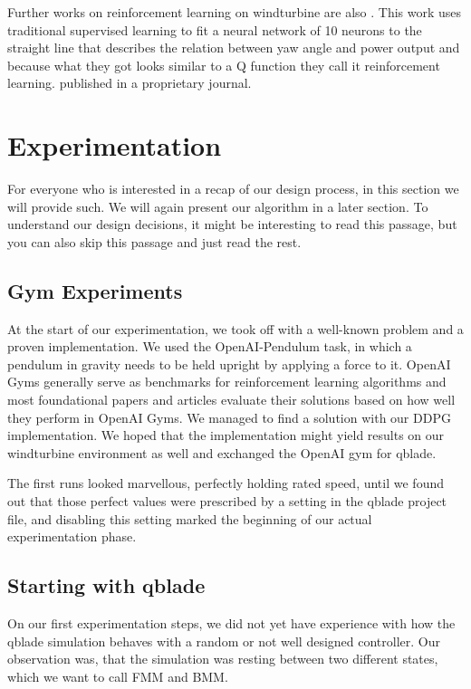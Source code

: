 \documentclass[hyperref,beleg]{cgvpub}
\begin{document}
Further works on reinforcement learning on windturbine are also \cite{saenz-aguirreArtificialNeuralNetwork2019}. This work uses traditional supervised learning to fit a neural network of 10 neurons to the straight line that describes the relation between yaw angle and power output and because what they got looks similar to a Q function they call it reinforcement learning. \cite{fernandez-gaunaVariableSpeedWind2016} published in a proprietary journal. 


\chapter{Experimentation}

For everyone who is interested in a recap of our design process, in this section we will provide such. We will again present our algorithm in a later section. To understand our design decisions, it might be interesting to read this passage, but you can also skip this passage and just read the rest. 

\section{Gym Experiments}

At the start of our experimentation, we took off with a well-known problem and a proven implementation. We used the OpenAI-Pendulum task, in which a pendulum in gravity needs to be held upright by applying a force to it. OpenAI Gyms generally serve as benchmarks for reinforcement learning algorithms and most foundational papers and articles evaluate their solutions based on how well they perform in OpenAI Gyms. We managed to find a solution with our DDPG implementation. We hoped that the implementation might yield results on our windturbine environment as well and exchanged the OpenAI gym for qblade.

The first runs looked marvellous, perfectly holding rated speed, until we found out that those perfect values were prescribed by a setting in the qblade project file, and disabling this setting marked the beginning of our actual experimentation phase.

\section{Starting with qblade}

On our first experimentation steps, we did not yet have experience with how the qblade simulation behaves with a random or not well designed controller. Our observation was, that the simulation was resting between two different states, which we want to call \ac{FMM} and \ac{BMM}.
\end{document}
